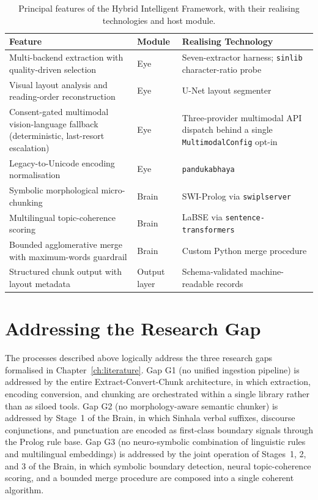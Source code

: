 \documentclass[12pt,a4paper,oneside]{report}
\begin{document}
\begin{table}[h]
\centering
\caption{Principal features of the Hybrid Intelligent Framework, with their realising technologies and host module.}
\label{tab:approach-features}
\renewcommand{\arraystretch}{1.25}
\footnotesize
\begin{tabularx}{\textwidth}{p{4.4cm} p{2.6cm} X}
\hline
\textbf{Feature} & \textbf{Module} & \textbf{Realising Technology} \\
\hline
Multi-backend extraction with quality-driven selection & Eye & Seven-extractor harness; \texttt{sinlib} character-ratio probe \\
\hline
Visual layout analysis and reading-order reconstruction & Eye & U-Net layout segmenter \cite{ronneberger2015unet, wickramasinghe2024unet} \\
\hline
Consent-gated multimodal vision-language fallback (deterministic, last-resort escalation) & Eye & Three-provider multimodal API dispatch \cite{google2024gemini} behind a single \texttt{MultimodalConfig} opt-in \\
\hline
Legacy-to-Unicode encoding normalisation & Eye & \texttt{pandukabhaya} \\
\hline
Symbolic morphological micro-chunking & Brain & SWI-Prolog \cite{wielemaker2012swiprolog} via \texttt{swiplserver} \\
\hline
Multilingual topic-coherence scoring & Brain & LaBSE \cite{feng2022labse} via \texttt{sentence-transformers} \\
\hline
Bounded agglomerative merge with maximum-words guardrail & Brain & Custom Python merge procedure \\
\hline
Structured chunk output with layout metadata & Output layer & Schema-validated machine-readable records \\
\hline
\end{tabularx}
\end{table}

\section{Addressing the Research Gap}
\label{sec:approach-gap-map}
The processes described above logically address the three research gaps formalised in Chapter~\ref{ch:literature}. Gap G1 (no unified ingestion pipeline) is addressed by the entire Extract-Convert-Chunk architecture, in which extraction, encoding conversion, and chunking are orchestrated within a single library rather than as siloed tools. Gap G2 (no morphology-aware semantic chunker) is addressed by Stage~1 of the Brain, in which Sinhala verbal suffixes, discourse conjunctions, and punctuation are encoded as first-class boundary signals through the Prolog rule base. Gap G3 (no neuro-symbolic combination of linguistic rules and multilingual embeddings) is addressed by the joint operation of Stages~1, 2, and 3 of the Brain, in which symbolic boundary detection, neural topic-coherence scoring, and a bounded merge procedure are composed into a single coherent algorithm.
\end{document}
